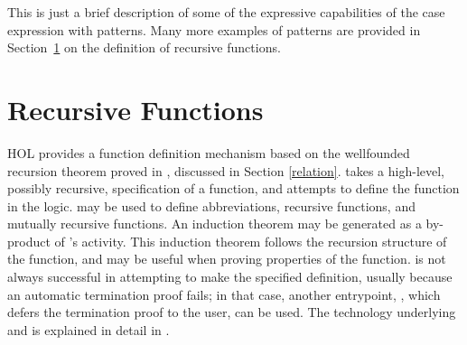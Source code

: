 This is just a brief description of some of the
expressive capabilities of the case expression with patterns.
Many more examples of patterns are provided in Section~\ref{TFL}
on the definition of recursive functions.



\section{Recursive Functions}\label{TFL}

HOL{} provides a function definition mechanism based on the
wellfounded recursion theorem proved in ,
discussed in Section \ref{relation}.   takes a high-level,
possibly recursive, specification of a function, and attempts to
define the function in the logic.  may be used to define
abbreviations, recursive functions, and mutually recursive
functions. An induction theorem may be generated as a by-product of
's activity. This induction theorem follows the recursion
structure of the function, and may be useful when proving properties
of the function.  is not always successful in attempting
to make the specified definition, usually because an automatic
termination proof fails; in that case, another entrypoint, ,
which defers the termination proof to the user, can be used.
The technology underlying  and  is explained
in detail in \cite{slind-thesis}.



